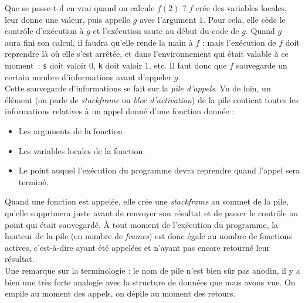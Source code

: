 \documentclass{magnolia}
\begin{document}
Que se passe-t-il \og en vrai \fg quand on calcule $f(2)$ ? $f$ crée des
variables locales, leur donne une valeur, puis appelle $g$ avec l'argument $1$.
Pour cela, elle cède le contrôle d'exécution à $g$ et l'exécution \og saute \fg au
début du code de $g$. Quand $g$ aura fini son calcul, il faudra qu'elle rende
la main à $f$ : mais l'exécution de $f$ doit reprendre là où elle s'est arrêtée,
et dans l'environnement qui était valable à ce moment~: \verb!s! doit valoir $0$,
\verb!k! doit valoir $1$, etc. Il faut donc que $f$ sauvegarde un certain nombre
d'informations avant d'appeler $g$.\\

Cette sauvegarde d'informations se fait sur la \emph{pile
  d'appels}.
Vu de loin, un élément (on parle de \emph{stackframe} ou \emph{bloc d'activation})
de la pile contient
toutes les informations relatives à un appel donné d'une fonction donnée :
\begin{itemize}
  \item Les arguments de la fonction
  \item Les variables locales de la fonction.
  \item Le point auquel l'exécution du programme devra reprendre quand
        l'appel sera terminé.
\end{itemize}\smallskip

Quand une fonction est appelée, elle crée une
\emph{stackframe}
   au sommet de
la pile, qu'elle supprimera juste avant de renvoyer son résultat et de passer
le contrôle au point qui était sauvegardé. À tout moment de l'exécution du
programme, la hauteur de la pile (en nombre de \emph{frames}) est donc égale au
nombre de fonctions actives, c'est-à-dire ayant été appelées et n'ayant pas
encore retourné leur résultat.\\

Une remarque sur la terminologie : le nom de \og pile \fg n'est bien sûr pas anodin,
il y a bien une très forte analogie avec la structure de données que nous avons
vue. On empile au moment des appels, on dépile au moment
des retours.

\end{document}
